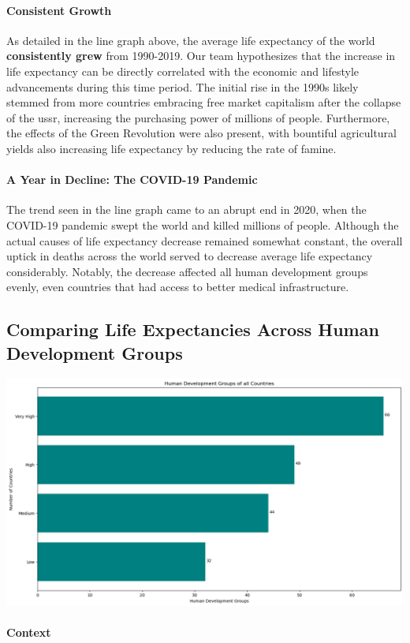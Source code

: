\documentclass[twocolumn, switch]{article}
\begin{document}
\paragraph{Consistent Growth}

As detailed in the line graph above, the average life expectancy of the world \textbf{consistently grew} from 1990-2019. Our team hypothesizes that the increase in life expectancy can be directly correlated with the economic and lifestyle advancements during this time period. The initial rise in the 1990s likely stemmed from more countries embracing free market capitalism after the collapse of the \acrshort{ussr}, increasing the purchasing power of millions of people. Furthermore, the effects of the Green Revolution were also present, with bountiful agricultural yields also increasing life expectancy by reducing the rate of famine.

\paragraph{A Year in Decline: The COVID-19 Pandemic}

The trend seen in the line graph came to an abrupt end in 2020, when the COVID-19 pandemic swept the world and killed millions of people. Although the actual causes of life expectancy decrease remained somewhat constant, the overall uptick in deaths across the world served to decrease average life expectancy considerably. Notably, the decrease affected all human development groups evenly, even countries that had access to better medical infrastructure.

\subsection{Comparing Life Expectancies Across Human Development Groups}

\includegraphics[width=0.7\linewidth]{files/490bc14e53c1c451efc0b8a57d512a7e.png}

\paragraph{Context}
\end{document}
